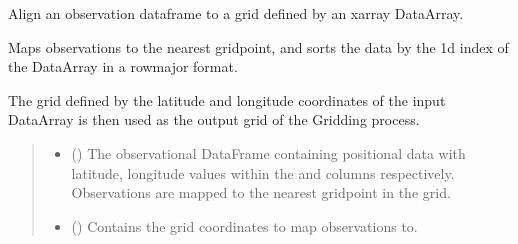 \documentclass[letterpaper,10pt,english]{sphinxmanual}
\begin{document}
\begin{fulllineitems}
\label{\detokenize{kriging:glomar_gridding.grid.map_to_grid}}
\pysigstartsignatures
\pysiglinewithargsret
{}
{\sphinxparamcomma {}\sphinxparamcomma {}\sphinxparamcomma {}\sphinxparamcomma {}\sphinxparamcomma {}\sphinxparamcomma {}\sphinxparamcomma {}}
{}
\pysigstopsignatures
\sphinxAtStartPar
Align an observation dataframe to a grid defined by an xarray DataArray.

\sphinxAtStartPar
Maps observations to the nearest grid\sphinxhyphen{}point, and sorts the data by the
1d index of the DataArray in a row\sphinxhyphen{}major format.

\sphinxAtStartPar
The grid defined by the latitude and longitude coordinates of the input
DataArray is then used as the output grid of the Gridding process.
\begin{quote}\begin{description}
\begin{itemize}
\item {}
\sphinxAtStartPar
{} () \textendash{} The observational DataFrame containing positional data with latitude,
longitude values within the  and  columns
respectively. Observations are mapped to the nearest grid\sphinxhyphen{}point in the
grid.

\item {}
\sphinxAtStartPar
{} () \textendash{} Contains the grid coordinates to map observations to.


\end{itemize}
\end{description}
\end{quote}
\end{fulllineitems}
\end{document}
